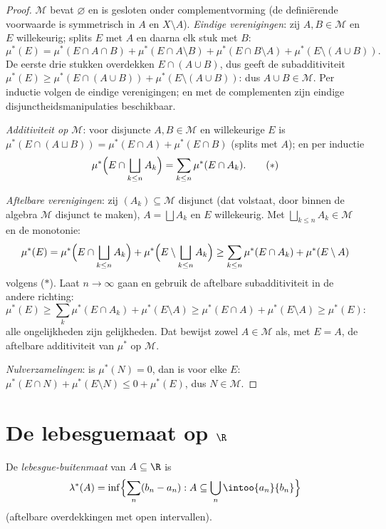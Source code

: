 \begin{proof}
$\mathcal M$ bevat $\varnothing$ en is gesloten onder
complementvorming (de definiërende voorwaarde is symmetrisch in
$A$ en $X\setminus A$). \emph{Eindige verenigingen}: zij $A, B \in
\mathcal M$ en $E$ willekeurig; splits $E$ met $A$ en daarna elk
stuk met $B$:
\[
\mu^*(E) = \mu^*(E\cap A\cap B) + \mu^*(E\cap A\setminus B) +
\mu^*(E\cap B\setminus A) + \mu^*(E\setminus(A\cup B)).
\]
De eerste drie stukken overdekken $E \cap (A \cup B)$, dus geeft
de subadditiviteit $\mu^*(E) \geq \mu^*(E\cap(A\cup B)) +
\mu^*(E\setminus(A\cup B))$: dus $A \cup B \in \mathcal M$. Per
inductie volgen de eindige verenigingen; en met de complementen
zijn eindige disjunctheidsmanipulaties beschikbaar.

\emph{Additiviteit op $\mathcal M$}: voor disjuncte $A, B \in
\mathcal M$ en willekeurige $E$ is $\mu^*(E\cap(A\sqcup B)) =
\mu^*(E\cap A) + \mu^*(E \cap B)$ (splits met $A$); en per
inductie
\[
\mu^*\Bigl(E \cap \bigsqcup_{k\leq n}A_k\Bigr)
= \sum_{k\leq n}\mu^*(E\cap A_k).
\tag{$*$}
\]

\emph{Aftelbare verenigingen}: zij $(A_k) \subseteq \mathcal M$
disjunct (dat volstaat, door binnen de algebra $\mathcal M$
disjunct te maken), $A = \bigsqcup A_k$ en $E$ willekeurig. Met
$\bigsqcup_{k\leq n}A_k \in \mathcal M$ en de monotonie:
\[
\mu^*(E) = \mu^*\Bigl(E\cap\bigsqcup_{k\leq n}A_k\Bigr) +
\mu^*\Bigl(E\setminus\bigsqcup_{k\leq n}A_k\Bigr)
\geq \sum_{k \leq n}\mu^*(E\cap A_k) + \mu^*(E\setminus A)
\]
volgens ($*$). Laat $n \to \infty$ gaan en gebruik de aftelbare
subadditiviteit in de andere richting:
\[
\mu^*(E) \geq \sum_{k}\mu^*(E\cap A_k) + \mu^*(E\setminus A)
\geq \mu^*(E \cap A) + \mu^*(E\setminus A) \geq \mu^*(E):
\]
alle ongelijkheden zijn gelijkheden. Dat bewijst zowel $A \in
\mathcal M$ als, met $E = A$, de aftelbare additiviteit van
$\mu^*$ op $\mathcal M$.

\emph{Nulverzamelingen}: is $\mu^*(N) = 0$, dan is voor elke $E$:
$\mu^*(E \cap N) + \mu^*(E\setminus N) \leq 0 + \mu^*(E)$, dus $N
\in \mathcal M$.
\end{proof}

\section{De lebesguemaat op \texorpdfstring{$\R$}{R}}

\begin{definition}\label{def:b3:measure:lebesgueouter}
De \emph{lebesgue-buitenmaat} van $A \subseteq
\R$ is
\[
\lambda^*(A) = \inf\Bigl\{\sum_{n} (b_n - a_n) :
A \subseteq \bigcup_n \intoo{a_n}{b_n}\Bigr\}
\]
(aftelbare overdekkingen met open intervallen).
\end{definition}

